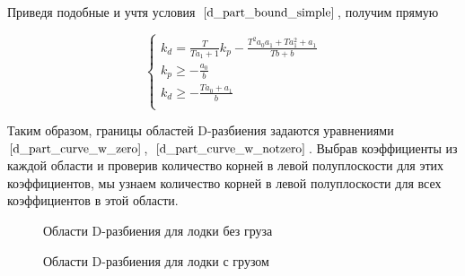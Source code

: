 \documentclass[a4paper]{article}
\begin{document}
Приведя подобные и учтя условия~$\eqref{d_part_bound_simple}$, получим прямую

\begin{equation}
	\label{d_part_curve_w_notzero}
	\begin{cases}
		k_d = \frac{T}{Ta_1+1}k_p - \frac{T^2a_0a_1 + Ta_1^2+a_1}{Tb+b} \\
		k_p \ge -\frac{a_0}{b} \\
		k_d \ge -\frac{Ta_0+a_1}{b} \\
	\end{cases}
\end{equation}

Таким образом, границы областей D-разбиения задаются уравнениями~$\eqref{d_part_curve_w_zero}$,~$\eqref{d_part_curve_w_notzero}$. Выбрав коэффициенты из каждой области и проверив количество корней в левой полуплоскости для этих коэффициентов, мы узнаем количество корней в левой полуплоскости для всех коэффициентов в этой области.

\begin{figure}
	\caption{Области D-разбиения для лодки без груза}
\end{figure}

\begin{figure}
	\caption{Области D-разбиения для лодки с грузом}
\end{figure}
\end{document}

